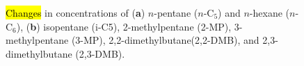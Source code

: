 \documentclass[mathematics,article,accept,pdftex,moreauthors]{Definitions/mdpi}
\begin{document}
	\begin{figure}[H]
		\hspace{-12pt}
		\begin{minipage}{0.5\linewidth}
		\end{minipage}
		\begin{minipage}{0.5\linewidth}
		\end{minipage}
		\caption{\hl{Changes} %
 in concentrations of (\textbf{a}) $n$-pentane ($n$-C$_5$) and $n$-hexane ($n$-C$_6$), (\textbf{b}) isopentane (i-C5), 2-methylpentane (2-MP), 3-methylpentane (3-MP), 2,2-dimethylbutane(2,2-DMB), and 2,3-dimethylbutane (2,3-DMB).}\label{fig:res1}
	\end{figure}  
\end{document}

